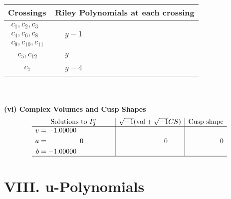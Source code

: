 \documentclass[1p]{elsarticle_modified}
\theoremstyle{definition}
\newcommand{\I}{\sqrt{-1}}
\begin{document}
\begin{tabular}{m{50pt}|m{274pt}}
Crossings & \hspace{64pt}Riley Polynomials at each crossing \\
\hline $$\begin{aligned}c_{1},c_{2},c_{3}\\c_{4},c_{6},c_{8}\\c_{9},c_{10},c_{11}\end{aligned}$$&$\begin{aligned}
&y-1
\end{aligned}$\\
\hline $$\begin{aligned}c_{5},c_{12}\end{aligned}$$&$\begin{aligned}
&y
\end{aligned}$\\
\hline $$\begin{aligned}c_{7}\end{aligned}$$&$\begin{aligned}
&y-4
\end{aligned}$\\
\hline
\end{tabular}\\~\\
\newpage\flushleft \textbf{(vi) Complex Volumes and Cusp Shapes}
$$\begin{array}{c|c|c}  
\text{Solutions to }I^v_{3}& \I (\text{vol} + \sqrt{-1}CS) & \text{Cusp shape}\\
 \hline 
\begin{aligned}
v &= -1.00000\phantom{ +0.000000I} \\
a &= \phantom{-0.000000 } 0 \\
b &= -1.00000\phantom{ +0.000000I}\end{aligned}
 & \phantom{-0.000000 } 0 & \phantom{-0.000000 } 0\\
 \hline 
 \end{array}$$\newpage
\newpage\renewcommand{\arraystretch}{1}
\centering \section*{ VIII. u-Polynomials}
\end{document}
